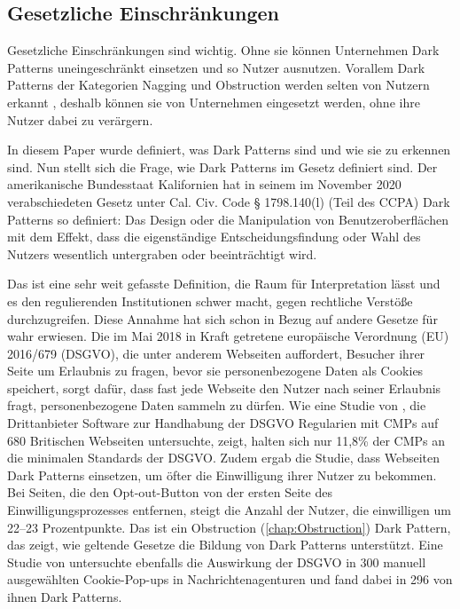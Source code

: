 \documentclass[conference,compsoc,final,a4paper]{IEEEtran}
\begin{document}



\subsection{Gesetzliche Einschränkungen}
Gesetzliche Einschränkungen sind wichtig. Ohne sie können Unternehmen Dark Patterns uneingeschränkt einsetzen und so Nutzer ausnutzen. Vorallem Dark Patterns der Kategorien Nagging und Obstruction werden selten von Nutzern erkannt \autocites{Gray_2018}{M.Bhoot2020}, deshalb können sie von Unternehmen eingesetzt werden, ohne ihre Nutzer dabei zu verärgern.

In diesem Paper wurde definiert, was Dark Patterns sind und wie sie zu erkennen sind. Nun stellt sich die Frage, wie Dark Patterns im Gesetz definiert sind. Der amerikanische Bundesstaat Kalifornien hat in seinem im November 2020 verabschiedeten Gesetz unter Cal. Civ. Code § 1798.140(l) (Teil des \ac{CCPA}) Dark Patterns so definiert: Das Design oder die Manipulation von Benutzeroberflächen mit dem Effekt, dass die eigenständige Entscheidungsfindung oder Wahl des Nutzers wesentlich untergraben oder beeinträchtigt wird.

Das ist eine sehr weit gefasste Definition, die Raum für Interpretation lässt und es den regulierenden Institutionen schwer macht, gegen rechtliche Verstöße durchzugreifen. Diese Annahme hat sich schon in Bezug auf andere Gesetze für wahr erwiesen. Die im Mai 2018 in Kraft getretene europäische Verordnung (EU) 2016/679 (\ac{DSGVO}), die unter anderem Webseiten auffordert, Besucher ihrer Seite um Erlaubnis zu fragen, bevor sie personenbezogene Daten als Cookies speichert, sorgt dafür, dass fast jede Webseite den Nutzer nach seiner Erlaubnis fragt, personenbezogene Daten sammeln zu dürfen. Wie eine Studie von \citeauthor{Nouwens2020} \autocite{Nouwens2020}, die Drittanbieter Software zur Handhabung der \ac{DSGVO} Regularien mit \acp{CMP} auf 680 Britischen Webseiten untersuchte, zeigt, halten sich nur 11,8\% der \acp{CMP} an die minimalen Standards der \ac{DSGVO}. Zudem ergab die Studie, dass Webseiten Dark Patterns einsetzen, um öfter die Einwilligung ihrer Nutzer zu bekommen. Bei Seiten, die den Opt-out-Button von der ersten Seite des Einwilligungsprozesses entfernen, steigt die Anzahl der Nutzer, die einwilligen um 22–23 Prozentpunkte. Das ist ein Obstruction (\autoref{chap:Obstruction}) Dark Pattern, das zeigt, wie geltende Gesetze die Bildung von Dark Patterns unterstützt. Eine Studie von \citeauthor{Soe2020} \autocite{Soe2020} untersuchte ebenfalls die Auswirkung der \ac{DSGVO} in 300 manuell ausgewählten Cookie-Pop-ups in Nachrichtenagenturen und fand dabei in 296 von ihnen Dark Patterns.
\end{document}
